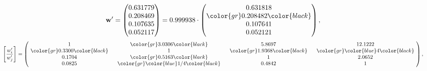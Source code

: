 \begin{example}
\begin{equation*}
\mathbf{w}^{\prime} =
\begin{pmatrix}
0.631779\\
0.208469\\
0.107635\\
0.052117
\end{pmatrix} =
0.999938\cdot
\begin{pmatrix}
0.631818\\
\color{gr} 0.208482\color{black} \\
0.107641\\
0.052121
\end{pmatrix},
\end{equation*}
\begin{equation*}
\left[ \frac{{w}^{\prime}_i}{{w}^{\prime}_j} \right] =
\begin{pmatrix}
$\,\,$ 1 $\,\,$ & $\,\,$\color{gr} 3.0306\color{black} $\,\,$ & $\,\,$5.8697$\,\,$ & $\,\,$12.1222$\,\,$ \\
$\,\,$\color{gr} 0.3300\color{black} $\,\,$ & $\,\,$ 1 $\,\,$ & $\,\,$\color{gr} 1.9368\color{black} $\,\,$ & $\,\,$\color{gr} \color{blue} 4\color{black}   $\,\,$ \\
$\,\,$0.1704$\,\,$ & $\,\,$\color{gr} 0.5163\color{black} $\,\,$ & $\,\,$ 1 $\,\,$ & $\,\,$2.0652 $\,\,$ \\
$\,\,$0.0825$\,\,$ & $\,\,$\color{gr} \color{blue}  1/4\color{black} $\,\,$ & $\,\,$0.4842$\,\,$ & $\,\,$ 1  $\,\,$ \\
\end{pmatrix},
\end{equation*}
\end{example}
\newpage
